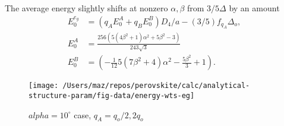 \documentclass[a4paper,prb,twocolumn]{revtex4-1}  %
\newcommand{\com}[1]{}
\begin{document}
The average energy slightly shifts at nonzero $\alpha,\beta$
from $3/5\Delta$ by an amount
\begin{align}
E_0^{e_{g}} &= \left(q_A E_0^A +q_B E_0^B\right)D_4/a - (3/5)f_{q_A}\Delta_o,\\
E_0^A &=
\frac{256 \left(5 \left(4 \beta ^2+1\right) \alpha ^2+5 \beta ^2-3\right)}{243 \sqrt{3}}\\
E_0^B &=
(-\frac{1}{12} 5 \left(7 \beta ^2+4\right) \alpha ^2-\frac{5 \beta ^2}{3}+1).
\end{align}


\com{
\begin{align}
H_{x^2-y^2,z^2}&=
\left[\frac{}{} \Lambda_{2}  D_2 + \Lambda_4 D_4\right],\\
\Lambda_{l} =&  \left(q_A \Lambda_{l}^A + q_B\Lambda_{l}^B\right)/a,~(l=2,4),\\
\Lambda_{2}^A =&
\frac{256 \alpha ^2 \beta }{189},\\
\Lambda_{4}^A =&
-\frac{1}{567} \left(5120 \alpha ^2 \beta \right),\\
\Lambda_{2}^B =&\frac{1}{7} (-4) \sqrt{3} \alpha ^2 \beta ,\\
\Lambda_{4}^B =&\frac{10}{7} \sqrt{3} \alpha ^2 \beta
\end{align}
}



\begin{figure}[htbp]
\begin{center}
\texttt{[image: /Users/maz/repos/perovskite/calc/analytical-structure-param/fig-data/energy-wts-eg]}
\caption{$alpha=10^\circ$ case, $q_A=q_o/2,2q_o$}
\label{fig:e-wts-eg}
\end{center}
\end{figure}
\end{document}
